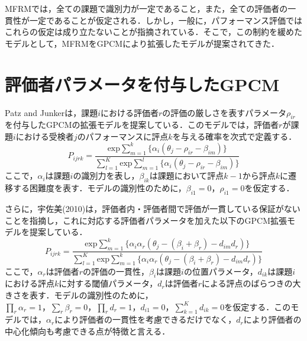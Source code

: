 \documentclass[a4paper,11pt,oneside,openany]{jsbook}
\begin{document}
MFRMでは，全ての課題で識別力が一定であること，また，全ての評価者の一貫性が一定であることが仮定される．しかし，一般に，パフォーマンス評価ではこれらの仮定は成り立たないことが指摘されている\cite{RashUsami,IRTUtoUeno}．そこで，この制約を緩めたモデルとして，MFRMをGPCMにより拡張したモデルが提案されてきた．

\section{評価者パラメータを付与したGPCM}
Patz and Junkerは，課題$i$における評価者$r$の評価の厳しさを表すパラメータ$\rho_{ir}$を付与したGPCMの拡張モデルを提案している\cite{Patz}．このモデルでは，評価者$r$が課題$i$における受検者$j$のパフォーマンスに評点$k$を与える確率を次式で定義する．
\begin{equation}
P_{ijrk}=\frac{\mathrm{exp}\sum_{m=1}^{k}\{\alpha_i(\theta_{j}-\rho_{ir}-\beta_{im})\}}{\sum_{l=1}^{K}\mathrm{exp}\sum_{m=1}^{l}\{\alpha_i(\theta_{j}-\rho_{ir}-\beta_{im})\}}
\end{equation}
ここで，$\alpha_i$は課題$i$の識別力を表し，$\beta_{ik}$は課題において評点$k-1$から評点$k$に遷移する困難度を表す．モデルの識別性のために，$\beta_{i1}=0，\rho_{i1}=0$を仮定する．

さらに，宇佐美(2010)は，評価者内・評価者間で評価が一貫している保証がないことを指摘し，これに対応する評価者パラメータを加えた以下のGPCM拡張モデルを提案している．
\begin{equation}
P_{ijrk}=\frac{\mathrm{exp}\sum_{m=1}^{k}\{\alpha_i\alpha_r(\theta_{j}-(\beta_{i}+\beta_{r})-d_{im}d_r)\}}{\sum_{l=1}^{K}\mathrm{exp}\sum_{m=1}^{k}\{\alpha_i\alpha_r(\theta_{j}-(\beta_{i}+\beta_{r})-d_{im}d_r)\}}
\end{equation}
ここで，$\alpha_r$は評価者$r$の評価の一貫性，$\beta_i$は課題$i$の位置パラメータ，$d_{ik}$は課題$i$における評点$k$に対する閾値パラメータ，$d_r$は評価者$r$による評点のばらつきの大きさを表す．モデルの識別性のために，$\prod_{r}\alpha_r=1，\sum_{r}\beta_r=0，\prod_{r}d_r=1，d_{i1}=0，\sum_{k=1}^{K}d_{ik}=0$を仮定する．このモデルでは，$\alpha_r$により評価者の一貫性を考慮できるだけでなく，$d_r$により評価者の中心化傾向も考慮できる点が特徴と言える．
\end{document}
